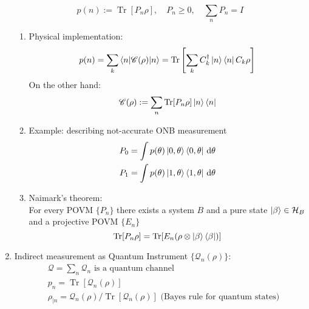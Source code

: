 \documentclass[11pt,a4paper]{article}%
\numberwithin{equation}{section}
\newcommand{\diff}{\,\mathrm{d}}
\newcommand{\Tr}{\operatorname{Tr}}
\begin{document}
\begin{enumerate}
    \begin{equation}
      p(n) := \Tr[P_n\rho],\quad P_n\ge 0,\quad \sum_n P_n = I
    \end{equation}
    \begin{enumerate}
        \item Physical implementation:
        \begin{equation}
          p(n) = \sum_k\braket{n|\mathscr C(\rho)|n} = \Tr\left[\sum_k C_k^\dagger\ket{n}\bra{n}C_k\rho\right]
        \end{equation}
        On the other hand:
        \begin{equation}
          \mathscr C(\rho) := \sum_n \Tr[P_n \rho] \ket n\bra n
        \end{equation}
        \item Example: describing not-accurate ONB measurement
        \begin{align}
            P_0 &= \int p(\theta)\ket{0,\theta}\bra{0,\theta}\diff\theta \\
            P_1 &= \int p(\theta)\ket{1,\theta}\bra{1,\theta}\diff\theta
        \end{align}
        \item Naimark's theorem: \\
        For every POVM $\{P_n\}$ there exists a system $B$ and a pure state $\ket\beta \in \mathcal H_B$ and a projective POVM $\{E_n\}$
        \begin{equation}
          \Tr[P_n\rho] = \Tr[E_n(\rho\otimes\ket\beta\bra\beta)]
        \end{equation}
    \end{enumerate}
    \item Indirect measurement as Quantum Instrument $\{\mathscr Q_n(\rho)\}$: 
    \begin{align}
        &\mathscr Q = \sum_n \mathscr Q_n \mbox{ is a quantum channel}\\
        &p_n = \Tr [\mathscr Q_n(\rho)] \\
        &\rho_{|n} = \mathscr Q_n(\rho) / \Tr[\mathscr Q_n(\rho)] \mbox{ (Bayes rule for quantum states)}

\end{align}
\end{enumerate}
\end{document}

